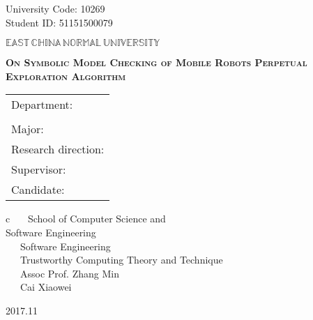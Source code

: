 \newpage

\pagestyle{empty}

\hskip 1.83cm {\large University Code: 10269}\\
\hspace*{\fill} {\large Student ID: 51151500079}

\vskip 2cm

\begin{center}
{\Huge $\mathbb{EAST}\,\mathbb{CHINA}\,\mathbb{NORMAL}\,
\mathbb{UNIVERSITY}$}
\end{center}

\vskip 3cm

\begin{center}
\bfseries{\scshape{\huge On Symbolic Model Checking of Mobile Robots Perpetual Exploration Algorithm}}\\
\end{center}

\vskip 2cm {\large
\begin{center}
\begin{tabular}{l}
Department:\\
\\
Major:\\
Research direction:\\
Supervisor:\\
Candidate:
\end{tabular}
\begin{tabular}c
~~~School of Computer Science and \\
\hline Software Engineering \\
\hline ~~~Software Engineering    \\
\hline ~~~Trustworthy Computing Theory and Technique\\
\hline ~~~Assoc Prof. Zhang Min \\
\hline ~~~Cai Xiaowei \\
\hline
\end{tabular}
\end{center}}

\vskip 30mm

\begin{center}
{\Large 2017.11}
\end{center}
